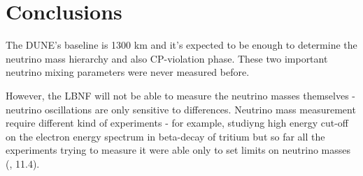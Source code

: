 \section{Conclusions}
The DUNE's baseline is 1300 km and it's expected to be enough to determine the neutrino mass hierarchy and also CP-violation phase. These two important neutrino mixing parameters were never measured before.

However, the LBNF will not be able to measure the neutrino masses themselves - neutrino oscillations are only sensitive to differences. Neutrino mass measurement require different kind of experiments - for example, studiyng high energy cut-off on the electron energy spectrum in beta-decay of tritium but so far all the experiments trying to measure it were able only to set limits on neutrino masses (\cite{ref_Griffiths}, 11.4).  
